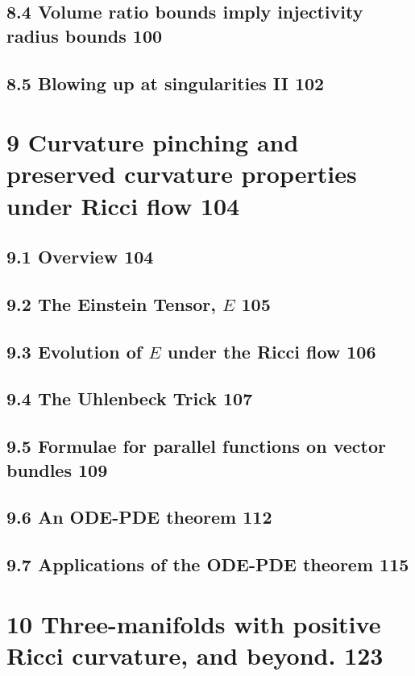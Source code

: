 \subsection*{8.4 \quad Volume ratio bounds imply injectivity radius bounds \hfill 100}
\subsection*{8.5 \quad Blowing up at singularities II \hfill 102}

\section*{9 \quad Curvature pinching and preserved curvature properties under Ricci flow \hfill 104}
\subsection*{9.1 \quad Overview \hfill 104}
\subsection*{9.2 \quad The Einstein Tensor, $E$ \hfill 105}
\subsection*{9.3 \quad Evolution of $E$ under the Ricci flow \hfill 106}
\subsection*{9.4 \quad The Uhlenbeck Trick \hfill 107}
\subsection*{9.5 \quad Formulae for parallel functions on vector bundles \hfill 109}
\subsection*{9.6 \quad An ODE-PDE theorem \hfill 112}
\subsection*{9.7 \quad Applications of the ODE-PDE theorem \hfill 115}

\section*{10 \quad Three-manifolds with positive Ricci curvature, and beyond. \hfill 123}

